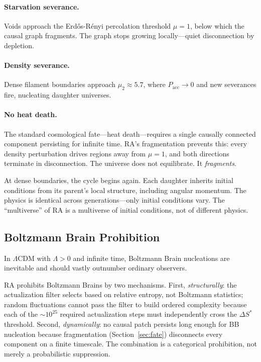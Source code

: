 \documentclass[11pt,a4paper]{article}
\theoremstyle{plain}
\theoremstyle{definition}
\theoremstyle{remark}
\begin{document}
\paragraph{Starvation severance.}
Voids approach the Erd\H{o}s-R\'enyi percolation threshold $\mu = 1$,
below which the causal graph fragments. The graph stops growing
locally---quiet disconnection by depletion.

\paragraph{Density severance.}
Dense filament boundaries approach $\mu_2 \approx 5.7$, where
$P_{\mathrm{acc}} \to 0$ and new severances fire, nucleating daughter
universes.

\paragraph{No heat death.}
The standard cosmological fate---heat death---requires a single
causally connected component persisting for infinite time. RA's
fragmentation prevents this: every density perturbation drives
regions away from $\mu = 1$, and both directions terminate in
disconnection. The universe does not equilibrate. It \emph{fragments}.

At dense boundaries, the cycle begins again. Each daughter inherits
initial conditions from its parent's local structure, including
angular momentum. The physics is identical across
generations---only initial conditions vary. The ``multiverse'' of RA
is a multiverse of initial conditions, not of different physics.

\subsection{Boltzmann Brain Prohibition}
\label{sec:boltzmann}

In $\Lambda$CDM with $\Lambda > 0$ and infinite time, Boltzmann
Brain nucleations are inevitable and should vastly outnumber ordinary
observers.

RA prohibits Boltzmann Brains by two mechanisms. First,
\emph{structurally}: the actualization filter selects based on
relative entropy, not Boltzmann statistics; random fluctuations
cannot pass the filter to build ordered complexity because each of
the $\sim\!10^{25}$ required actualization steps must independently
cross the $\Delta S^*$ threshold. Second, \emph{dynamically}: no
causal patch persists long enough for BB nucleation because
fragmentation (Section~\ref{sec:fate}) disconnects every component
on a finite timescale. The combination is a categorical prohibition,
not merely a probabilistic suppression.
\end{document}
